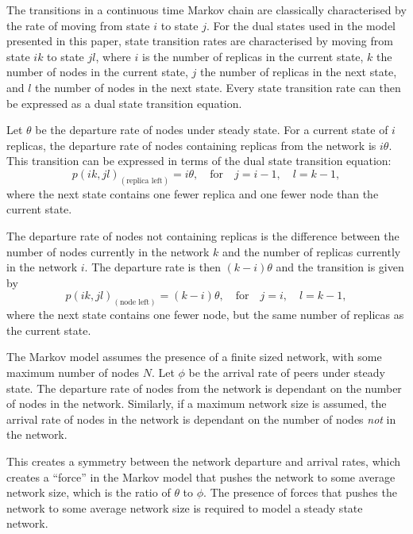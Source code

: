 \documentclass[10pt,a4paper,conference]{IEEEtran}
\begin{document}
The transitions in a continuous time Markov chain are classically characterised by the rate of moving from state $i$ to state $j$. For the dual states used in the model presented in this paper, state transition rates are characterised by moving from state $i k$ to state $j l$, where $i$ is the number of replicas in the current state, $k$ the number of nodes in the current state, $j$ the number of replicas in the next state, and $l$ the number of nodes in the next state. Every state transition rate can then be expressed as a dual state transition equation.

Let $\theta$ be the departure rate of nodes under steady state. For a current state of $i$ replicas, the departure rate of nodes containing replicas from the network is $i\theta$. This transition can be expressed in terms of the dual state transition equation:
%
\begin{equation} \label{eq_rep_left}
    p(i k,j l)_{(\textrm{replica left})} = i\theta,\quad\textrm{for}\quad j = i - 1,\quad l = k - 1,
\end{equation}
%
where the next state contains one fewer replica and one fewer node than the current state.

The departure rate of nodes not containing replicas is the difference between the number of nodes currently in the network $k$ and the number of replicas currently in the network $i$. The departure rate is then $(k - i)\theta$ and the transition is given by
%
\begin{equation} \label{eq_node_left}
    p(i k,j l)_{(\textrm{node left})} = (k - i)\theta,\quad\textrm{for}\quad j = i,\quad l = k - 1,
\end{equation}
%
where the next state contains one fewer node, but the same number of replicas as the current state.

The Markov model assumes the presence of a finite sized network, with some maximum number of nodes $N$. Let $\phi$ be the arrival rate of peers under steady state. The departure rate of nodes from the network is dependant on the number of nodes in the network. Similarly, if a maximum network size is assumed, the arrival rate of nodes in the network is dependant on the number of nodes \emph{not} in the network.

This creates a symmetry between the network departure and arrival rates, which creates a ``force'' in the Markov model that pushes the network to some average network size, which is the ratio of $\theta$ to $\phi$. The presence of forces that pushes the network to some average network size is required to model a steady state network.
\end{document}
